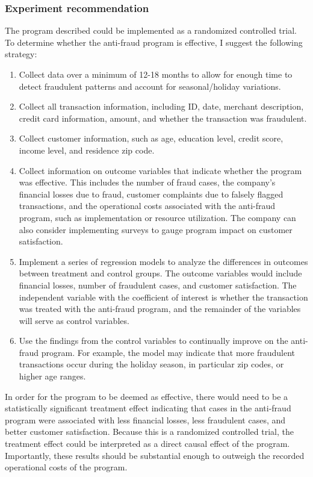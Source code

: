 \documentclass[
  letterpaper,
  DIV=11,
  numbers=noendperiod]{scrartcl}
\providecommand{\tightlist}{%
  \setlength{\itemsep}{0pt}\setlength{\parskip}{0pt}}\usepackage{longtable,booktabs,array}
\begin{document}
\subsubsection{Experiment
recommendation}\label{experiment-recommendation}

The program described could be implemented as a randomized controlled
trial. To determine whether the anti-fraud program is effective, I
suggest the following strategy:

\begin{enumerate}
\def\labelenumi{\arabic{enumi}.}
\tightlist
\item
  Collect data over a minimum of 12-18 months to allow for enough time
  to detect fraudulent patterns and account for seasonal/holiday
  variations.
\item
  Collect all transaction information, including ID, date, merchant
  description, credit card information, amount, and whether the
  transaction was fraudulent.
\item
  Collect customer information, such as age, education level, credit
  score, income level, and residence zip code.
\item
  Collect information on outcome variables that indicate whether the
  program was effective. This includes the number of fraud cases, the
  company's financial losses due to fraud, customer complaints due to
  falsely flagged transactions, and the operational costs associated
  with the anti-fraud program, such as implementation or resource
  utilization. The company can also consider implementing surveys to
  gauge program impact on customer satisfaction.
\item
  Implement a series of regression models to analyze the differences in
  outcomes between treatment and control groups. The outcome variables
  would include financial losses, number of fraudulent cases, and
  customer satisfaction. The independent variable with the coefficient
  of interest is whether the transaction was treated with the anti-fraud
  program, and the remainder of the variables will serve as control
  variables.
\item
  Use the findings from the control variables to continually improve on
  the anti-fraud program. For example, the model may indicate that more
  fraudulent transactions occur during the holiday season, in particular
  zip codes, or higher age ranges.
\end{enumerate}

In order for the program to be deemed as effective, there would need to
be a statistically significant treatment effect indicating that cases in
the anti-fraud program were associated with less financial losses, less
fraudulent cases, and better customer satisfaction. Because this is a
randomized controlled trial, the treatment effect could be interpreted
as a direct causal effect of the program. Importantly, these results
should be substantial enough to outweigh the recorded operational costs
of the program.
\end{document}
